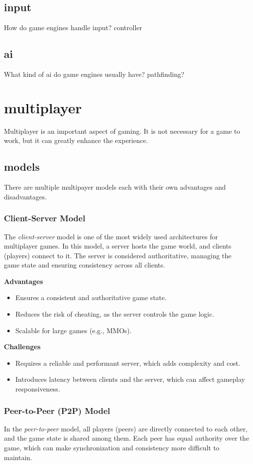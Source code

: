 \documentclass{article} %
\begin{document}
\subsection{input}
How do game engines handle input?
controller
\subsection{ai}
What kind of ai do game engines usually have?
pathfinding?
\newpage

\section{multiplayer}
Multiplayer is an important aspect of gaming. It is not necessary for a game to work, but it can greatly enhance the experience.
\subsection{models}
There are multiple multipayer models each with their own advantages and disadvantages.

\subsubsection{Client-Server Model}
The \textit{client-server} model is one of the most widely used architectures for multiplayer games. In this model, a server hosts the game world, and clients (players) connect to it. The server is considered authoritative, managing the game state and ensuring consistency across all clients.

\textbf{Advantages}
\begin{itemize}
	\item Ensures a consistent and authoritative game state.
	\item Reduces the risk of cheating, as the server controls the game logic.
	\item Scalable for large games (e.g., MMOs).
\end{itemize}

\textbf{Challenges}
\begin{itemize}
	\item Requires a reliable and performant server, which adds complexity and cost.
	\item Introduces latency between clients and the server, which can affect gameplay responsiveness.
\end{itemize}

\subsubsection{Peer-to-Peer (P2P) Model}
In the \textit{peer-to-peer} model, all players (peers) are directly connected to each other, and the game state is shared among them. Each peer has equal authority over the game, which can make synchronization and consistency more difficult to maintain.
\end{document}
